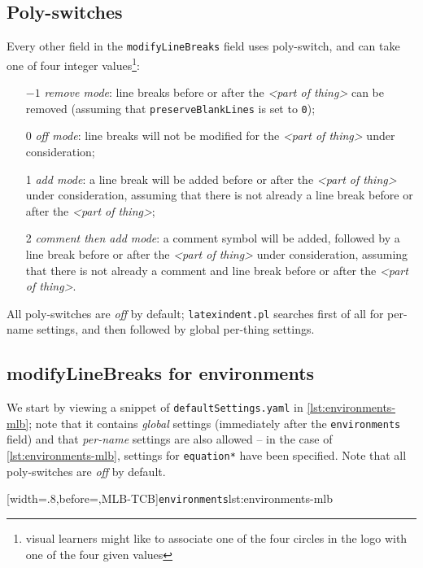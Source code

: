 \subsection{Poly-switches}
	Every other field in the \texttt{modifyLineBreaks} field uses poly-switch, and can take
	one of four integer values\footnote{visual learners might like to associate one of the four circles in the logo with one of the four given values}:
	\begin{itemize}[font=\bfseries]
		\item[$-1$] \emph{remove mode}: line breaks before or after the \emph{<part of thing>} can be removed (assuming that \texttt{preserveBlankLines} is set to \texttt{0});
		\item[0] \emph{off mode}: line breaks will not be modified for the \emph{<part of thing>} under consideration;
		\item[1] \emph{add mode}: a line break will be added before or after the \emph{<part of thing>} under consideration, assuming that
		      there is not already a line break before or after the \emph{<part of thing>};
		\item[2] \emph{comment then add mode}: a comment symbol will be added, followed by a line break before or after the \emph{<part of thing>} under consideration, assuming that
		      there is not already a comment and line break before or after the \emph{<part of thing>}.
	\end{itemize}
	All poly-switches are \emph{off} by default; \texttt{latexindent.pl} searches first of all for per-name settings, and then followed by global per-thing settings.

\subsection{modifyLineBreaks for environments}\label{sec:modifylinebreaks-environments}
	We start by viewing a snippet of \texttt{defaultSettings.yaml} in \cref{lst:environments-mlb}; note that it contains \emph{global} settings (immediately
	after the \texttt{environments} field) and that \emph{per-name} settings are also allowed -- in the case of \cref{lst:environments-mlb}, settings
	for \texttt{equation*} have been specified. Note that all poly-switches are \emph{off} by default.

	[width=.8\linewidth,before=\centering,MLB-TCB]{\texttt{environments}}{lst:environments-mlb}

